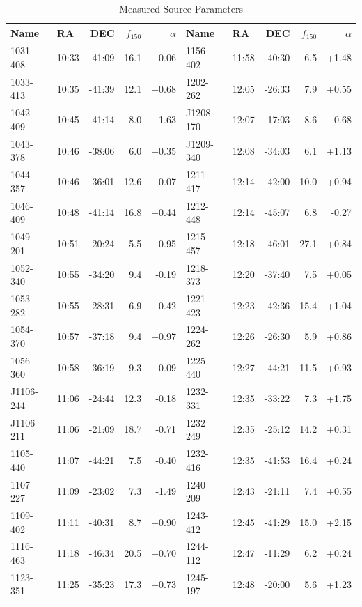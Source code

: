 \documentclass[preprint]{aastex}
\begin{document}
\begin{table}[ht]
\caption{Measured Source Parameters}
\begin{tabular}{l|lrrr||l|lrrr}
\hline
Name & RA & DEC & $f_{150}$ & $\alpha$ & Name & RA & DEC & $f_{150}$ & $\alpha$
\\
\hline
  1031-408 & 10:33 & -41:09 &   16.1 & +0.06 &   1156-402 & 11:58 & -40:30 &    6.5 & +1.48 \\
  1033-413 & 10:35 & -41:39 &   12.1 & +0.68 &   1202-262 & 12:05 & -26:33 &    7.9 & +0.55 \\
  1042-409 & 10:45 & -41:14 &    8.0 & -1.63 &  J1208-170 & 12:07 & -17:03 &    8.6 & -0.68 \\
  1043-378 & 10:46 & -38:06 &    6.0 & +0.35 &  J1209-340 & 12:08 & -34:03 &    6.1 & +1.13 \\
  1044-357 & 10:46 & -36:01 &   12.6 & +0.07 &   1211-417 & 12:14 & -42:00 &   10.0 & +0.94 \\
  1046-409 & 10:48 & -41:14 &   16.8 & +0.44 &   1212-448 & 12:14 & -45:07 &    6.8 & -0.27 \\
  1049-201 & 10:51 & -20:24 &    5.5 & -0.95 &   1215-457 & 12:18 & -46:01 &   27.1 & +0.84 \\
  1052-340 & 10:55 & -34:20 &    9.4 & -0.19 &   1218-373 & 12:20 & -37:40 &    7.5 & +0.05 \\
  1053-282 & 10:55 & -28:31 &    6.9 & +0.42 &   1221-423 & 12:23 & -42:36 &   15.4 & +1.04 \\
  1054-370 & 10:57 & -37:18 &    9.4 & +0.97 &   1224-262 & 12:26 & -26:30 &    5.9 & +0.86 \\
  1056-360 & 10:58 & -36:19 &    9.3 & -0.09 &   1225-440 & 12:27 & -44:21 &   11.5 & +0.93 \\
 J1106-244 & 11:06 & -24:44 &   12.3 & -0.18 &   1232-331 & 12:35 & -33:22 &    7.3 & +1.75 \\
 J1106-211 & 11:06 & -21:09 &   18.7 & -0.71 &   1232-249 & 12:35 & -25:12 &   14.2 & +0.31 \\
  1105-440 & 11:07 & -44:21 &    7.5 & -0.40 &   1232-416 & 12:35 & -41:53 &   16.4 & +0.24 \\
  1107-227 & 11:09 & -23:02 &    7.3 & -1.49 &   1240-209 & 12:43 & -21:11 &    7.4 & +0.55 \\
  1109-402 & 11:11 & -40:31 &    8.7 & +0.90 &   1243-412 & 12:45 & -41:29 &   15.0 & +2.15 \\
  1116-463 & 11:18 & -46:34 &   20.5 & +0.70 &   1244-112 & 12:47 & -11:29 &    6.2 & +0.24 \\
  1123-351 & 11:25 & -35:23 &   17.3 & +0.73 &   1245-197 & 12:48 & -20:00 &    5.6 & +1.23 \\

\end{tabular}
\end{table}
\end{document}
